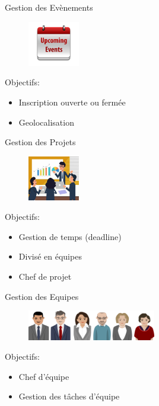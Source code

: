 \begin{frame}{Gestion des Evènements}
\begin{figure}[h!]
  \includegraphics[width=0.20\textwidth]{images/Event}
\end{figure}
Objectifs:
  \begin{itemize}
    \item Inscription ouverte ou fermée
    \item Geolocalisation
  \end{itemize}
\end{frame}


\begin{frame}{Gestion des Projets}
\begin{figure}[h!]
  \includegraphics[width=0.20\textwidth]{images/projet}
\end{figure}
Objectifs:
  \begin{itemize}
    \item Gestion de temps (deadline)
    \item Divisé en équipes
    \item Chef de projet
  \end{itemize}
\end{frame}

\begin{frame}{Gestion des Equipes}
\begin{figure}[h!]
  \includegraphics[width=0.5\textwidth]{images/team}
\end{figure}
Objectifs:
  \begin{itemize}
    \item Chef d'équipe
    \item Gestion des tâches d'équipe
  \end{itemize}
\end{frame}

